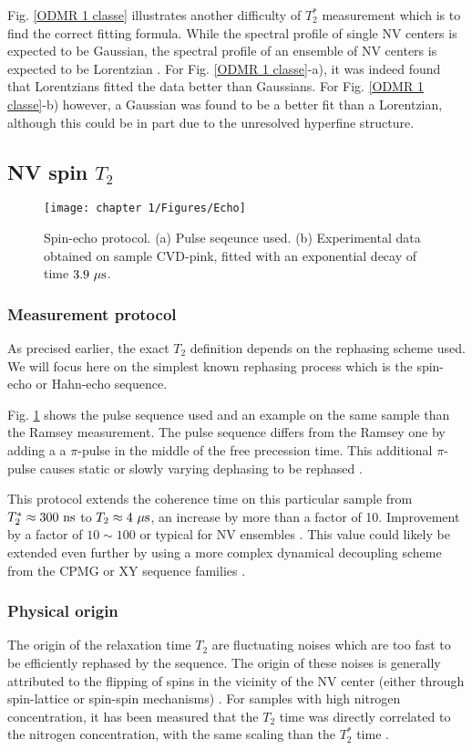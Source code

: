 \documentclass[a4paper, 11pt]{report}
\begin{document}
Fig. \ref{ODMR 1 classe} illustrates another difficulty of $T_2^*$ measurement which is to find the correct fitting formula. While the spectral profile of single NV centers is expected to be Gaussian, the spectral profile of an ensemble of NV centers  is expected to be Lorentzian \citep{dobrovitski2008decoherence, hall2014analytic}. For Fig. \ref{ODMR 1 classe}-a), it was indeed found that Lorentzians fitted the data better than Gaussians. For Fig. \ref{ODMR 1 classe}-b) however, a Gaussian was found to be a better fit than a Lorentzian, although this could be in part due to the unresolved hyperfine structure.

\subsection{NV spin $T_2$}
\label{sec T2 echo}
\begin{figure}[h!]
\centering
\texttt{[image: chapter 1/Figures/Echo]}
\caption{Spin-echo protocol. (a) Pulse seqeunce used. (b) Experimental data obtained on sample CVD-pink, fitted with an exponential decay of time $3.9\ \rm{\mu s}$.} 
\label{Echo}
\end{figure}
\subsubsection{Measurement protocol}
As precised earlier, the exact $T_2$ definition depends on the rephasing scheme used. We will focus here on the simplest known rephasing process which is the spin-echo or Hahn-echo sequence.

Fig. \ref{Echo} shows the pulse sequence used and an example on the same sample than the Ramsey measurement. The pulse sequence differs from the Ramsey one by adding a a $\pi$-pulse in the middle of the free precession time. This additional $\pi$-pulse causes static or slowly varying dephasing to be rephased \citep{hahn1950spin}. 

This protocol extends the coherence time on this particular sample from $T_2^* \approx 300\ \rm ns$ to $T_2 \approx 4\ \rm{\mu s}$, an increase by more than a factor of 10. Improvement by a factor of $10 \sim 100$ or typical for NV ensembles \citep{barry2020sensitivity}. This value could likely be extended even further by using a more complex dynamical decoupling scheme from the CPMG or XY sequence families \citep{naydenov2011dynamical, bar2012suppression}.

\subsubsection{Physical origin}
The origin of the relaxation time $T_2$ are fluctuating noises which are too fast to be efficiently rephased by the sequence. The origin of these noises is generally attributed to the flipping of spins in the vicinity of the NV center (either through spin-lattice or spin-spin mechanisms) \citep{hall2014analytic}. For samples with high nitrogen concentration, it has been measured that the $T_2$ time  was directly correlated to the nitrogen concentration, with the same scaling than the $T_2^*$ time \citep{bauch2019decoherence}.
\end{document}
